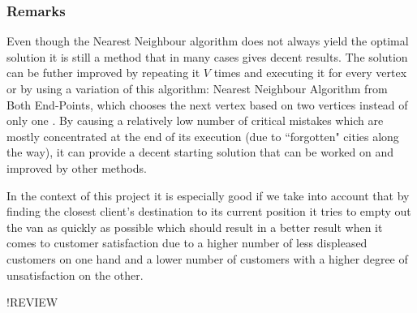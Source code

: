 \subsubsection{Remarks}
Even though the Nearest Neighbour algorithm does not always yield the optimal solution it is still a method that in many cases gives decent results.
The solution can be futher improved by repeating it $V$ times and executing it for every vertex or by using a variation of this algorithm: Nearest Neighbour Algorithm from Both End-Points, which chooses the next vertex based on two vertices instead of only one \cite{NN-algorithm}.
By causing a relatively low number of critical mistakes which are mostly concentrated at the end of its execution (due to ``forgotten" cities along the way), it can provide a decent starting solution that can be worked on and improved by other methods.\par
In the context of this project it is especially good if we take into account that by finding the closest client's destination to its current position it tries to empty out the van as quickly as possible
which should result in a better result when it comes to customer satisfaction due to a higher number of less displeased customers on one hand and a lower number of customers with a higher degree of unsatisfaction on the other.
\par
!REVIEW